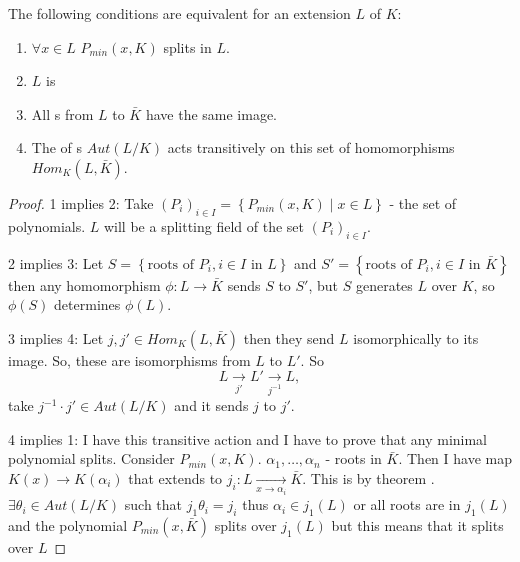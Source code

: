 \begin{theorem}
  The following conditions are equivalent for an extension $L$ of $K$:
  \begin{enumerate}
  \item $\forall x \in L$ $P_{min}\left(x, K\right)$ splits in $L$.
  \item $L$ is 
  \item All s from $L$ to $\bar{K}$ have the
    same image.
  \item The  of s
    $Aut\left(L/K\right)$ acts transitively on this set of
    homomorphisms $Hom_K\left(L, \bar{K}\right)$.
  \end{enumerate}
  \begin{proof}
    1 implies 2: Take
    $\left(P_i\right)_{i \in I} = \left\{P_{min}\left(x, K\right) \mid
    x \in L\right\}$ - the set of polynomials.
    $L$ will be a splitting field of the set $\left(P_i\right)_{i \in I}$.

    2 implies 3: Let
    $S = \left\{\mbox{roots of } P_i, i \in I \mbox{ in } L\right\}$
    and
    $S' = \left\{\mbox{roots of } P_i, i \in I \mbox{ in }
    \bar{K}\right\}$ then any homomorphism
    $\phi: L \to \bar{K}$ sends $S$ to $S'$, but $S$ generates $L$
    over $K$, so $\phi\left(S\right)$ determines $\phi\left(L\right)$.

    3 implies 4: Let $j, j' \in Hom_K\left(L, \bar{K}\right)$ then
    they send $L$ isomorphically to its image. So, these are
    isomorphisms from $L$ to $L'$. So
    \[
    L \xrightarrow[j']{} L' \xrightarrow[j^{-1}]{} L,
    \]
    take $j^{-1} \cdot j' \in Aut \left(L/K\right)$ and it sends $j$
    to $j'$.

    4 implies 1:  I have this transitive action and I have to prove
    that any minimal polynomial splits. Consider
    $P_{min}\left(x, K\right)$. $\alpha_1, \dots, \alpha_n$ - roots in
    $\bar{K}$. Then I have map $K\left(x\right) \to
    K\left(\alpha_i\right)$ that extends to
    $j_i: L \xrightarrow[x \to \alpha_i]{} \bar{K}$. This is by
    theorem .
    $\exists \theta_i \in Aut\left(L/K\right)$ such that
    $j_1 \theta_i = j_i$ thus
    $\alpha_i \in j_1\left(L\right)$ or all roots are in
    $j_1\left(L\right)$ and the polynomial
    $P_{min}\left(x, \bar{K}\right)$ splits over $j_1\left(L\right)$
    but this means that it splits over $L$    
  \end{proof}
  \label{thm:lec5_3}
\end{theorem}

